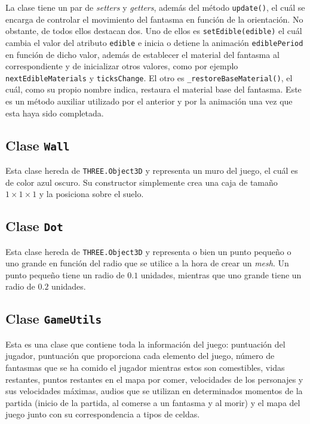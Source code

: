 \documentclass[11pt,a4paper]{article}
\begin{document}
La clase tiene un par de \textit{setters} y \textit{getters}, además del método
\texttt{update()}, el cuál se encarga de controlar el movimiento del fantasma en función de
la orientación. No obstante, de todos ellos destacan dos. Uno de ellos es
\texttt{setEdible(edible)} el cuál cambia el valor del atributo \texttt{edible} e inicia o
detiene la animación \texttt{ediblePeriod} en función de dicho valor, además de establecer el
material del fantasma al correspondiente y de inicializar otros valores, como por ejemplo
\texttt{nextEdibleMaterials} y \texttt{ticksChange}. El otro es \texttt{\_restoreBaseMaterial()},
el cuál, como su propio nombre indica, restaura el material base del fantasma. Este es un
método auxiliar utilizado por el anterior y por la animación una vez que esta haya sido
completada.

\subsection{Clase \texttt{Wall}}

Esta clase hereda de \texttt{THREE.Object3D} y representa un muro del juego, el cuál es de color
azul oscuro. Su constructor simplemente crea una caja de tamaño $1 \times 1 \times 1$ y la
posiciona sobre el suelo.

\subsection{Clase \texttt{Dot}}

Esta clase hereda de \texttt{THREE.Object3D} y representa o bien un punto pequeño o uno grande
en función del radio que se utilice a la hora de crear un \textit{mesh}. Un punto pequeño tiene
un radio de $0.1$ unidades, mientras que uno grande tiene un radio de $0.2$ unidades.

\subsection{Clase \texttt{GameUtils}}

Esta es una clase que contiene toda la información del juego: puntuación del jugador, puntuación
que proporciona cada elemento del juego, número de fantasmas que se ha comido el jugador
mientras estos son comestibles, vidas restantes, puntos restantes en el mapa por comer,
velocidades de los personajes y sus velocidades máximas, audios que se utilizan en determinados
momentos de la partida (inicio de la partida, al comerse a un fantasma y al morir) y el mapa del
juego junto con su correspondencia a tipos de celdas.
\end{document}
